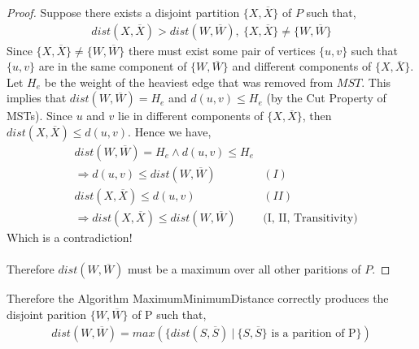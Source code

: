 \documentclass[12pt]{article}
\newenvironment{lemma}[2][Lemma]{\begin{trivlist}
\item[\hskip \labelsep {\bfseries #1}\hskip \labelsep {\bfseries #2.}]}{\end{trivlist}}
\newenvironment{question}[2][Question]{\begin{trivlist}
\item[\hskip \labelsep {\bfseries #1}\hskip \labelsep {\bfseries #2.}]}{\end{trivlist}}
\begin{document}
\begin{question}{3}
\begin{lemma}{3.1}
    \begin{proof}
      Suppose there exists a disjoint partition $\{X, \overline{X}\}$ of $P$ such
      that,
      \begin{align*}
        dist(X, \overline{X}) > dist(W, \overline{W}),\ \{X, \overline{X}\} \neq \{W, \overline{W}\}
      \end{align*}
      Since $\{X, \overline{X}\} \neq \{W, \overline{W}\}$
      there must exist some pair of vertices $\{u, v\}$ such that $\{u, v\}$
      are in the same component of $\{W, \overline{W}\}$ and different
      components of $\{X, \overline{X}\}$.
      Let $H_{e}$ be the weight of the heaviest edge that was removed from $MST$.
      This implies that $dist(W, \overline{W}) = H_{e}$ and $d(u, v) \leq H_{e}$
      (by the Cut Property of MSTs).
      Since $u$ and $v$ lie in different components of $\{X, \overline{X}\}$, then
      $dist(X, \overline{X}) \leq d(u, v)$.  Hence we have,
      \begin{align*}
        & dist(W, \overline{W}) = H_{e} \land d(u, v) \leq H_{e} & \\
        & \Rightarrow d(u, v) \leq dist(W, \overline{W}) & (I) \\
        & dist(X, \overline{X}) \leq d(u, v) & (II) \\
        & \Rightarrow dist(X, \overline{X}) \leq dist(W, \overline{W}) & \text{(I, II, Transitivity)}
      \end{align*}
      Which is a contradiction!\\ \\
      Therefore $dist(W, \overline{W})$ must be a maximum over all other paritions of $P$.
    \end{proof}

    Therefore the Algorithm MaximumMinimumDistance correctly produces the disjoint
    parition $\{W, \overline{W}\}$ of P such that,
    \begin{align*}
      dist(W, \overline{W}) = max(\{dist(S, \overline{S})\ |\ \{S, \overline{S}\} \text{ is a parition of P}\})
    \end{align*}
  \end{lemma}


\end{question}
\end{document}

